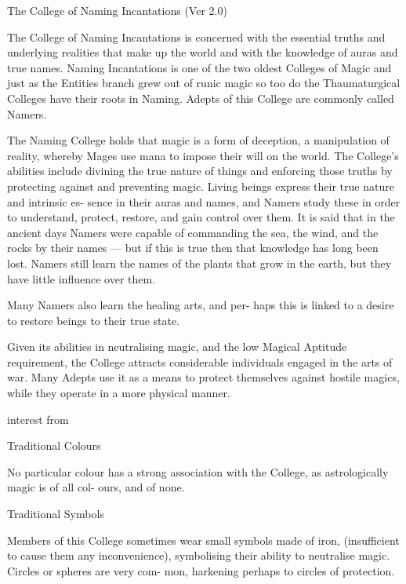 \begin{Chapter}{The College of Naming Incantations (Ver 2.0)}

The  College  of  Naming  Incantations  is  concerned 
with  the  essential  truths  and  underlying  realities 
that make up the world and with the knowledge of 
auras  and  true  names.  Naming  Incantations  is  one 
of the two oldest Colleges of Magic and just as the 
Entities  branch  grew  out  of  runic  magic  so  too  do 
the  Thaumaturgical  Colleges  have  their  roots  in 
Naming.  Adepts  of  this  College  are  commonly 
called Namers. 

The Naming College holds that magic is a form of 
deception,  a  manipulation  of  reality,  whereby 
Mages use mana to impose their will on the world. 
The  College’s  abilities  include  divining  the  true 
nature  of  things  and  enforcing  those  truths  by 
protecting  against  and  preventing  magic.  Living 
beings  express  their  true  nature  and  intrinsic  es-
sence  in their  auras and names,  and Namers  study 
these  in  order  to  understand,  protect,  restore,  and 
gain control over them. It is said that in the ancient 
days Namers were capable of commanding the sea, 
the  wind,  and  the  rocks  by  their  names  —  but  if 
this is true then that knowledge has long been lost. 
Namers still learn the names of the plants that grow 
in  the  earth,  but  they  have  little  influence  over 
them. 

Many  Namers  also  learn  the healing arts,  and  per-
haps  this  is  linked  to  a  desire  to  restore  beings  to 
their true state. 

Given  its  abilities  in  neutralising  magic,  and  the 
low  Magical  Aptitude  requirement,  the  College 
attracts  considerable 
individuals 
engaged in the arts of war. Many Adepts use it as a 
means to protect themselves against hostile magics, 
while they operate in a more physical manner. 

interest  from 

Traditional Colours 

No  particular  colour  has  a  strong  association  with 
the  College,  as  astrologically  magic  is  of  all  col-
ours, and of none. 

Traditional Symbols 

Members  of  this  College  sometimes  wear  small 
symbols  made  of  iron,  (insufficient  to  cause  them 
any  inconvenience),  symbolising  their  ability  to 
neutralise  magic. Circles  or  spheres  are  very  com-
mon, harkening perhaps to circles of protection. 


\end{Chapter}
